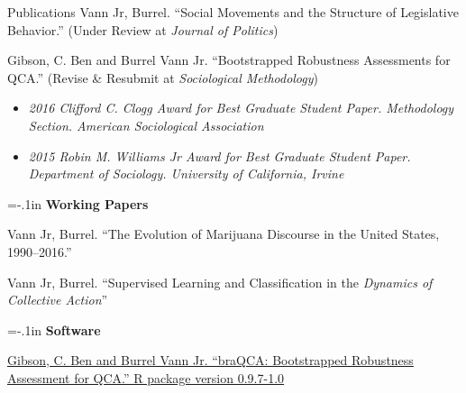 \begin{rSection}{Publications}
\vspace*{5pt}
Vann Jr, Burrel. ``Social Movements and the Structure of Legislative Behavior.'' (Under Review at \textit{Journal of Politics})

\vspace*{5pt}
Gibson, C. Ben and Burrel Vann Jr. ``Bootstrapped Robustness Assessments for QCA.'' (Revise \& Resubmit at {\it{Sociological Methodology}})\vspace*{-.75em} 
\begin{itemize}[leftmargin=.25in]
	\item {\footnotesize \it 2016 Clifford C. Clogg Award for Best Graduate Student Paper. Methodology Section. American Sociological Association}\vspace*{-.75em} 
	\item {\footnotesize \it 2015 Robin M. Williams Jr Award for Best Graduate Student Paper. Department of Sociology. University of California, Irvine}
\end{itemize}
 \vspace*{8pt}


{\parindent=-.1in {\bf Working Papers}}

\raggedright
Vann Jr, Burrel. ``The Evolution of Marijuana Discourse in the United States, 1990--2016.'' 
\vspace*{5pt}

Vann Jr, Burrel. ``Supervised Learning and Classification in the {\it{Dynamics of Collective Action}}''

 \vspace*{8pt}

{\parindent=-.1in {\bf Software}}

\href{https://cran.r-project.org/web/packages/braQCA/braQCA.pdf}{Gibson, C. Ben and Burrel Vann Jr. ``braQCA: Bootstrapped Robustness Assessment for QCA.'' R package version 0.9.7-1.0}
\end{rSection}





